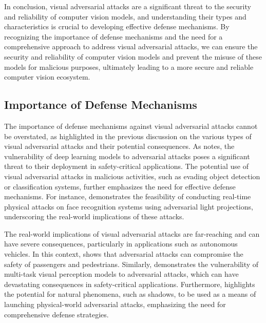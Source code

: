 \documentclass[11pt]{article}
\begin{document}
In conclusion, visual adversarial attacks are a significant threat to the security and reliability of computer vision models, and understanding their types and characteristics is crucial to developing effective defense mechanisms. By recognizing the importance of defense mechanisms and the need for a comprehensive approach to address visual adversarial attacks, we can ensure the security and reliability of computer vision models and prevent the misuse of these models for malicious purposes, ultimately leading to a more secure and reliable computer vision ecosystem.

\subsection{Importance of Defense Mechanisms}

The importance of defense mechanisms against visual adversarial attacks cannot be overstated, as highlighted in the previous discussion on the various types of visual adversarial attacks and their potential consequences. As \cite{ref7} notes, the vulnerability of deep learning models to adversarial attacks poses a significant threat to their deployment in safety-critical applications. The potential use of visual adversarial attacks in malicious activities, such as evading object detection or classification systems, further emphasizes the need for effective defense mechanisms. For instance, \cite{ref15} demonstrates the feasibility of conducting real-time physical attacks on face recognition systems using adversarial light projections, underscoring the real-world implications of these attacks.

The real-world implications of visual adversarial attacks are far-reaching and can have severe consequences, particularly in applications such as autonomous vehicles. In this context, \cite{ref16} shows that adversarial attacks can compromise the safety of passengers and pedestrians. Similarly, \cite{ref17} demonstrates the vulnerability of multi-task visual perception models to adversarial attacks, which can have devastating consequences in safety-critical applications. Furthermore, \cite{ref18} highlights the potential for natural phenomena, such as shadows, to be used as a means of launching physical-world adversarial attacks, emphasizing the need for comprehensive defense strategies.
\end{document}
